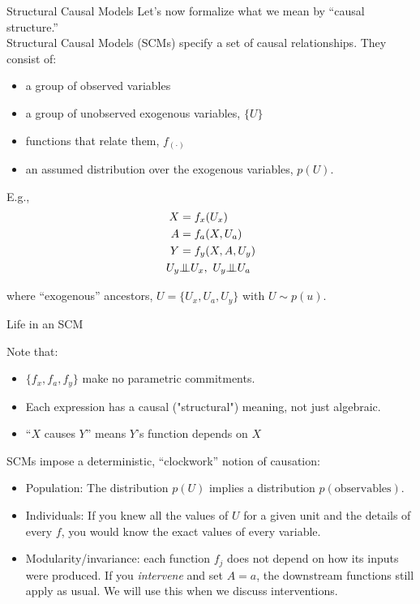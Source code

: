 \documentclass[xcolor=dvipsnames]{beamer}
\newcommand{\indep}{{\bot\negthickspace\negthickspace\bot}}
\begin{document}
\begin{frame}{Structural Causal Models}
 Let's now formalize what we mean by ``causal structure.'' \\
\medskip
{} Structural Causal Models (SCMs) specify a set of causal relationships.   They consist of:\\
\footnotesize
\begin{itemize}
\item a group of observed variables 
\item a group of unobserved exogenous variables, $\{U\}$
\item functions that relate them, $f_{(\cdot)}$
\item  an assumed distribution over the exogenous variables, $p(U)$.
\end{itemize}
  E.g.,
            \begin{align*}
                X &= f_{x}(U_x)\\
                A &= f_{a}(X, U_a)\\
                Y &= f_{y}(X, A, U_y)\\
                U_{y}&\indep U_{x},~ U_{y}\indep U_{a}
            \end{align*}
          
where ``exogenous'' ancestors,  $U = \{U_{x}, U_{a}, U_{y}\}$ with $U\sim p(u)$.  
\end{frame}

\begin{frame}{Life in an SCM}

 Note that:
\footnotesize
\begin{itemize}
\item $\{f_{x}, f_{a}, f_{y}\}$ make no parametric commitments.
\item Each expression has a causal ("structural") meaning, not just algebraic.
\item ``$X$ causes $Y$'' means $Y$'s function depends on $X$
\end{itemize}
\medskip
\normalsize
{} SCMs impose a deterministic, ``clockwork'' notion of causation:\\
\footnotesize
\begin{itemize}
\item<3-> Population: The distribution $p(U)$ implies a distribution $p(\text{observables})$.
\item<4-> Individuals: If you knew all the values of $U$ for a given unit and the details of every $f$, you would know the exact values of every variable.
\item<5-> Modularity/invariance: each function $f_j$ does not depend on how its inputs were produced. If you \textit{intervene} and set $A=a$, the downstream functions still apply as usual. We will use this when we discuss interventions.
\end{itemize}
\end{frame}
\end{document}
